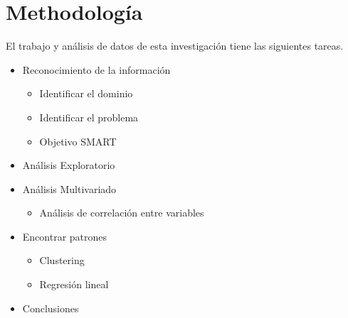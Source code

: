\section{Methodología}
 El trabajo y análisis de datos de esta investigación tiene las siguientes tareas.
 \begin{itemize}
  \item Reconocimiento de la información 
  \begin{itemize}
   \item Identificar el dominio
   \item Identificar el problema
   \item Objetivo SMART 
  \end{itemize}
  \item Análisis Exploratorio
  \item Análisis Multivariado
  \begin{itemize}
	\item Análisis de correlación entre variables
  \end{itemize}
  \item Encontrar patrones
   \begin{itemize}
    \item Clustering
    \item Regresión lineal
   \end{itemize}  
  \item Conclusiones
 \end{itemize}
